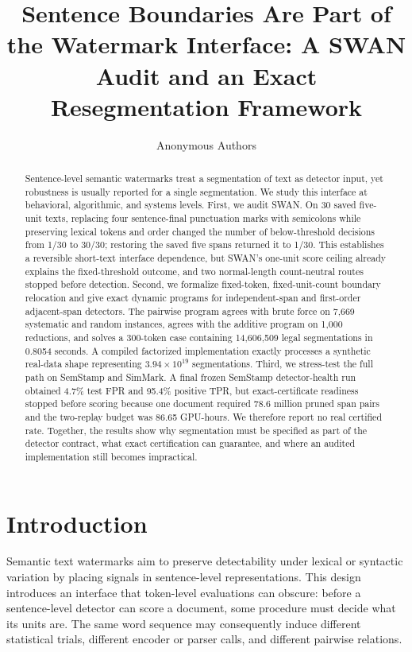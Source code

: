 \documentclass[10pt]{article}
\title{Sentence Boundaries Are Part of the Watermark Interface:
A SWAN Audit and an Exact Resegmentation Framework}
\author{\name Anonymous Authors}
\begin{document}
\maketitle

\begin{abstract}
Sentence-level semantic watermarks treat a segmentation of text as detector
input, yet robustness is usually reported for a single segmentation. We study
this interface at behavioral, algorithmic, and systems levels. First, we audit
SWAN. On 30 saved five-unit texts, replacing four sentence-final punctuation
marks with semicolons while preserving lexical tokens and order changed the
number of below-threshold decisions from 1/30 to 30/30; restoring the saved
five spans returned it to 1/30. This establishes a reversible short-text
interface dependence, but SWAN's one-unit score ceiling already explains the
fixed-threshold outcome, and two normal-length count-neutral routes stopped
before detection. Second, we formalize fixed-token, fixed-unit-count boundary
relocation and give exact dynamic programs for independent-span and
first-order adjacent-span detectors. The pairwise program agrees with brute
force on 7,669 systematic and random instances, agrees with the additive
program on 1,000 reductions, and solves a 300-token case containing
14,606,509 legal segmentations in 0.8054 seconds. A compiled factorized
implementation exactly processes a synthetic real-data shape representing
$3.94\times10^{19}$ segmentations. Third, we stress-test the full path on
SemStamp and SimMark. A final frozen SemStamp detector-health run obtained
4.7\% test FPR and 95.4\% positive TPR, but exact-certificate readiness
stopped before scoring because one document required 78.6 million pruned
span pairs and the two-replay budget was 86.65 GPU-hours. We therefore report
no real certified rate. Together, the results show why segmentation must be
specified as part of the detector contract, what exact certification can
guarantee, and where an audited implementation still becomes impractical.
\end{abstract}

\section{Introduction}

Semantic text watermarks aim to preserve detectability under lexical or
syntactic variation by placing signals in sentence-level representations.
This design introduces an interface that token-level evaluations can obscure:
before a sentence-level detector can score a document, some procedure must
decide what its units are. The same word sequence may consequently induce
different statistical trials, different encoder or parser calls, and
different pairwise relations.
\end{document}

